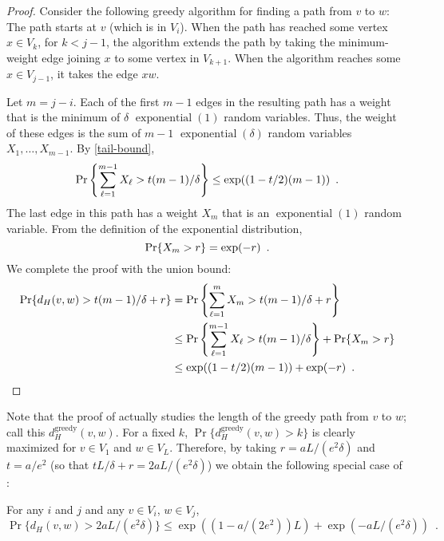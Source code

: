 \documentclass{patmorin}
\DeclareMathOperator{\exponential}{exponential}
\begin{document}
\begin{proof}
   Consider the following greedy algorithm for finding a path from $v$
   to $w$: The path starts at $v$ (which is in $V_i$).  When the path
   has reached some vertex $x\in V_{k}$, for $k<j-1$, the algorithm
   extends the path by taking the minimum-weight edge joining $x$ to some
   vertex in $V_{k+1}$.  When the algorithm reaches some $x\in V_{j-1}$,
   it takes the edge $xw$.

   Let $m=j-i$.  Each of the first $m-1$ edges in the resulting path
   has a weight that is the minimum of $\delta$ $\exponential(1)$
   random variables.  Thus, the weight of these edges is the sum of
   $m-1$ $\exponential(\delta)$ random variables $X_1,\ldots,X_{m-1}$.
   By \eqref{tail-bound},
   \begin{equation}
     \Pr\left\{\sum_{\ell=1}^{m-1} X_\ell > t(m-1)/\delta \right\} \le 
        \exp((1-t/2)(m-1)) \enspace .  \eqlabel{part-i}
   \end{equation}
   The last edge in this path has a weight $X_m$ that is an
   $\exponential(1)$ random variable.  From the definition
   of the exponential distribution,
   \begin{equation}
      \Pr\{X_m > r\} = \exp(-r) \enspace . \eqlabel{part-ii}
   \end{equation}
   We complete the proof with the union bound:
   \begin{align*}
      \Pr\{d_H(v,w) > t(m-1)/\delta + r\} &
        = \Pr\left\{\sum_{\ell=1}^m X_m > t(m-1)/\delta + r\right\} \\
        & \le \Pr\left\{\sum_{\ell=1}^{m-1} X_\ell > t(m-1)/\delta\right\}
          + \Pr\{X_m>r\} \\
        & \le \exp((1-t/2)(m-1)) + \exp(-r) \enspace . \qedhere
   \end{align*}
\end{proof}

Note that the proof of  actually studies the length of
the greedy path from $v$ to $w$; call this $d_H^{\mathrm{greedy}}(v,w)$.
For a fixed $k$, $\Pr\{d_H^{\mathrm{greedy}}(v,w) > k\}$ is clearly
maximized for $v\in V_1$ and $w\in V_L$. Therefore, by taking
$r=aL/(e^2\delta)$ and $t=a/e^2$ (so that $tL/\delta+r = 2aL/(e^2\delta)$)
we obtain the following special case of :

\begin{cor}
  For any $i$ and $j$ and any $v\in V_i$, $w\in V_j$, 
  \[
    \Pr\{d_H(v,w) > 2aL/(e^2\delta)\} 
        \le \exp((1-a/(2e^2))L) + \exp(-aL/(e^2\delta)) \enspace . 
  \]
\end{cor}
\end{document}
